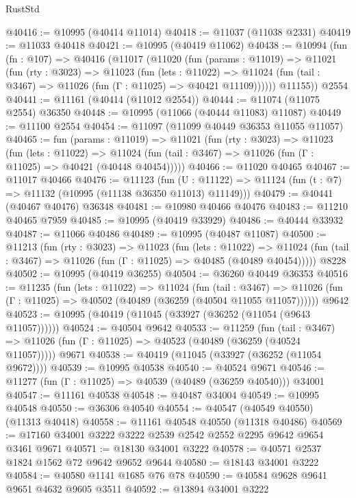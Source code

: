 \begin{lexlean}{RustStd}
\begin{coremodule}
@40416 := @10995 (@40414 @11014)
@40418 := @11037 (@11038 @2331)
@40419 := @11033 @40418
@40421 := @10995 (@40419 @11062)
@40438 := @10994
    (fun (fn : @107) =>
    @40416
      (@11017
        (@11020
          (fun (params : @11019) =>
          @11021
            (fun (rty : @3023) =>
            @11023
              (fun (lets : @11022) =>
              @11024 (fun (tail : @3467) => @11026 (fun (Γ : @11025) => @40421 @11109))))))
        @11155))
    @2554
@40441 := @11161 (@40414 (@11012 @2554))
@40444 := @11074 (@11075 @2554) @36350
@40448 := @10995 (@11066 (@40444 @11083) @11087)
@40449 := @11100 @2554
@40454 := @11097 (@11099 @40449 @36353 @11055 @11057)
@40465 := fun (params : @11019) =>
  @11021
    (fun (rty : @3023) =>
    @11023
      (fun (lets : @11022) =>
      @11024 (fun (tail : @3467) => @11026 (fun (Γ : @11025) => @40421 (@40448 @40454)))))
@40466 := @11020 @40465
@40467 := @11017 @40466
@40476 := @11123
    (fun (U : @11122) => @11124 (fun (t : @7) => @11132 (@10995 (@11138 @36350 @11013) @11149)))
@40479 := @40441 (@40467 @40476) @36348
@40481 := @10980 @40466 @40476
@40483 := @11210 @40465 @7959
@40485 := @10995 (@40419 @33929)
@40486 := @40444 @33932
@40487 := @11066 @40486
@40489 := @10995 (@40487 @11087)
@40500 := @11213
    (fun (rty : @3023) =>
    @11023
      (fun (lets : @11022) =>
      @11024 (fun (tail : @3467) => @11026 (fun (Γ : @11025) => @40485 (@40489 @40454)))))
    @8228
@40502 := @10995 (@40419 @36255)
@40504 := @36260 @40449 @36353
@40516 := @11235
    (fun (lets : @11022) =>
    @11024
      (fun (tail : @3467) =>
      @11026 (fun (Γ : @11025) => @40502 (@40489 (@36259 (@40504 @11055 @11057))))))
    @9642
@40523 := @10995 (@40419 (@11045 (@33927 (@36252 (@11054 (@9643 @11057))))))
@40524 := @40504 @9642
@40533 := @11259
    (fun (tail : @3467) => @11026 (fun (Γ : @11025) => @40523 (@40489 (@36259 (@40524 @11057)))))
    @9671
@40538 := @40419 (@11045 (@33927 (@36252 (@11054 @9672))))
@40539 := @10995 @40538
@40540 := @40524 @9671
@40546 := @11277 (fun (Γ : @11025) => @40539 (@40489 (@36259 @40540))) @34001
@40547 := @11161 @40538
@40548 := @40487 @34004
@40549 := @10995 @40548
@40550 := @36306 @40540
@40554 := @40547 (@40549 @40550) (@11313 @40418)
@40558 := @11161 @40548 @40550 (@11318 @40486)
@40569 := @17160 @34001 @3222 @3222 @2539 @2542 @2552 @2295 @9642 @9654 @3461 @9671
@40571 := @18130 @34001 @3222
@40578 := @40571 @2537 @1824 @1562 @72 @9642 @9652 @9644
@40580 := @18143 @34001 @3222
@40584 := @40580 @1141 @1685 @76 @78
@40590 := @40584 @9628 @9641 @9651 @4632 @9605 @3511
@40592 := @13894 @34001 @3222

\end{coremodule}
\end{lexlean}
